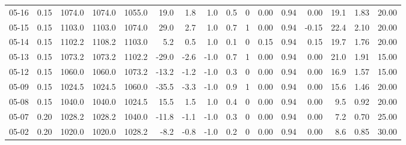 \begin{threeparttable}
{\begin{tabular}{lrrrrrrrrrrrrrrr}
  05-16 &     0.15 & 1074.0 & 1074.0 & 1055.0 &       19.0 &            1.8 &                      1.0 &                 0.5 &              0 &       0.00 &      0.94 &           0.00 &             19.1 &            1.83 &                  20.00 \\
  05-15 &     0.15 & 1103.0 & 1103.0 & 1074.0 &       29.0 &            2.7 &                      1.0 &                 0.7 &              1 &       0.00 &      0.94 &          -0.15 &             22.4 &            2.10 &                  20.00 \\
  05-14 &     0.15 & 1102.2 & 1108.2 & 1103.0 &        5.2 &            0.5 &                      1.0 &                 0.1 &              0 &       0.15 &      0.94 &           0.15 &             19.7 &            1.76 &                  20.00 \\
  05-13 &     0.15 & 1073.2 & 1073.2 & 1102.2 &      -29.0 &           -2.6 &                     -1.0 &                 0.7 &              1 &       0.00 &      0.94 &           0.00 &             21.0 &            1.91 &                  15.00 \\
  05-12 &     0.15 & 1060.0 & 1060.0 & 1073.2 &      -13.2 &           -1.2 &                     -1.0 &                 0.3 &              0 &       0.00 &      0.94 &           0.00 &             16.9 &            1.57 &                  15.00 \\
  05-09 &     0.15 & 1024.5 & 1024.5 & 1060.0 &      -35.5 &           -3.3 &                     -1.0 &                 0.9 &              1 &       0.00 &      0.94 &           0.00 &             15.6 &            1.46 &                  20.00 \\
  05-08 &     0.15 & 1040.0 & 1040.0 & 1024.5 &       15.5 &            1.5 &                      1.0 &                 0.4 &              0 &       0.00 &      0.94 &           0.00 &              9.5 &            0.92 &                  20.00 \\
  05-07 &     0.20 & 1028.2 & 1028.2 & 1040.0 &      -11.8 &           -1.1 &                     -1.0 &                 0.3 &              0 &       0.00 &      0.94 &           0.00 &              7.2 &            0.70 &                  25.00 \\
  05-02 &     0.20 & 1020.0 & 1020.0 & 1028.2 &       -8.2 &           -0.8 &                     -1.0 &                 0.2 &              0 &       0.00 &      0.94 &           0.00 &              8.6 &            0.85 &                  30.00 \\

\end{tabular}}
\end{threeparttable}
